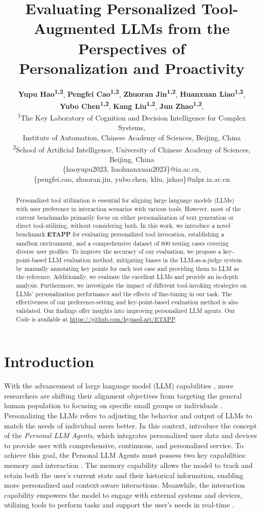\documentclass[11pt]{article}
\title{Evaluating Personalized Tool-Augmented LLMs from the Perspectives of \\ Personalization and Proactivity}
\author{
 \textbf{Yupu Hao\textsuperscript{1,2}},
 \textbf{Pengfei Cao\textsuperscript{1,2}},
 \textbf{Zhuoran Jin\textsuperscript{1,2}},
 \textbf{Huanxuan Liao\textsuperscript{1,2}},
\\
 \textbf{Yubo Chen\textsuperscript{1,2}},
 \textbf{Kang Liu\textsuperscript{1,2}},
 \textbf{Jun Zhao\textsuperscript{1,2}},
\\
 \textsuperscript{1}The Key Laboratory of Cognition and Decision Intelligence for Complex Systems, \\Institute of Automation, Chinese Academy of Sciences, Beijing, China\\
 \textsuperscript{2}School of Artificial Intelligence, University of Chinese Academy of Sciences, Beijing, China
\\
\{haoyupu2023, liaohuanxuan2023\}@ia.ac.cn, \\ \{pengfei.cao, zhuoran.jin, yubo.chen, kliu, jzhao\}@nlpr.ia.ac.cn
}
\begin{document}
\maketitle
\begin{abstract}
Personalized tool utilization is essential for aligning large language models (LLMs) with user preference in interaction scenarios with various tools. However, most of the current benchmarks primarily focus on either personalization of text generation or direct tool-utilizing, without considering both. In this work, we introduce a novel benchmark \textbf{ETAPP} for evaluating personalized tool invocation, establishing a sandbox environment, and a comprehensive dataset of 800 testing cases covering diverse user profiles. To improve the accuracy of our evaluation, we propose a key-point-based LLM evaluation method, mitigating biases in the LLM-as-a-judge system by manually annotating key points for each test case and providing them to LLM as the reference. Additionally, we evaluate the excellent LLMs and provide an in-depth analysis. Furthermore, we investigate the impact of different tool-invoking strategies on LLMs' personalization performance and the effects of fine-tuning in our task. The effectiveness of our preference-setting and key-point-based evaluation method is also validated. Our findings offer insights into improving personalized LLM agents. Our Code is available at \url{https://github.com/hypasd-art/ETAPP}.


\end{abstract}

\section{Introduction}
With the advancement of large language model (LLM) capabilities \cite{zhao2024surveylargelanguagemodels}, more researchers are shifting their alignment objectives from targeting the general human population to focusing on specific small groups or individuals \cite{chen2024personapersonalizationsurveyroleplaying, jang2023personalized}. Personalizing the LLMs refers to adjusting the behavior and output of LLMs to match the needs of individual users better. In this context, \citeauthor{li2024personalllmagentsinsights} introduce the concept of the \textit{Personal LLM Agents}, which integrates personalized user data and devices to provide user with comprehensive, continuous, and personalized service. To achieve this goal, the Personal LLM Agents must possess two key capabilities: memory \cite{zhang2024surveymemorymechanismlarge} and interaction \cite{10.1145/3704435, mialon2023augmentedlanguagemodelssurvey}. The memory capability allows the model to track and retain both the user's current state and their historical information, enabling more personalized and context-aware interactions. Meanwhile, the interaction capability empowers the model to engage with external systems and devices, utilizing tools to perform tasks and support the user’s needs in real-time \cite{li-etal-2023-api, DBLP:conf/iclr/QinLYZYLLCTQZHT24}.
\end{document}
